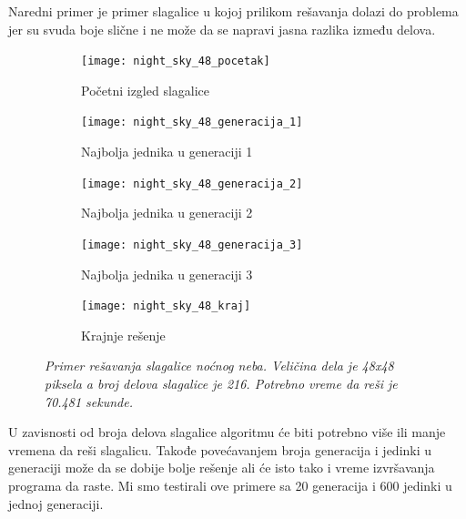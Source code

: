 \documentclass{article}
\begin{document}
Naredni primer je primer slagalice u kojoj prilikom rešavanja dolazi do problema jer su svuda boje slične i ne može da se napravi jasna razlika između delova.
\begin{figure}[h]
     \centering
	 \captionsetup{justification=centering}
     
     \begin{subfigure}[t]{0.3\textwidth}
         \centering
         \texttt{[image: night\_sky\_48\_pocetak]}
         \caption{{Početni izgled slagalice}}
         \label{fig:night_sky_48_pocetak}
     \end{subfigure}
     \hfill
     \begin{subfigure}[t]{0.3\textwidth}
         \centering
         \texttt{[image: night\_sky\_48\_generacija\_1]}
         \caption{{Najbolja jednika u generaciji 1}}
         \label{fig:night_sky_48_generacija_1}
     \end{subfigure}
     \hfill
     \begin{subfigure}[t]{0.3\textwidth}
         \centering
         \texttt{[image: night\_sky\_48\_generacija\_2]}
         \caption{{Najbolja jednika u generaciji 2}}
         \label{fig:night_sky_48_generacija_2}
     \end{subfigure}
     \begin{subfigure}[t]{0.3\textwidth}
         \centering
         \texttt{[image: night\_sky\_48\_generacija\_3]}
         \caption{{Najbolja jednika u generaciji 3}}
         \label{fig:night_sky_48_generacija_3}
     \end{subfigure}
     \begin{subfigure}[t]{0.3\textwidth}
         \centering
         \texttt{[image: night\_sky\_48\_kraj]}
         \caption{{Krajnje rešenje}}
         \label{fig:night_sky_48_kraj}
     \end{subfigure}
     
     \caption{\textit{Primer rešavanja slagalice noćnog neba. Veličina dela je 48x48 piksela a broj delova slagalice je 216. Potrebno vreme da reši je 70.481 sekunde.}}
\end{figure}

U zavisnosti od broja delova slagalice algoritmu će biti potrebno više ili manje vremena da reši slagalicu. Takođe povećavanjem broja generacija i jedinki u generaciji može da se dobije bolje rešenje ali će isto tako i vreme izvršavanja programa da raste.
Mi smo testirali ove primere sa 20 generacija i 600 jedinki u jednoj generaciji.
\end{document}
